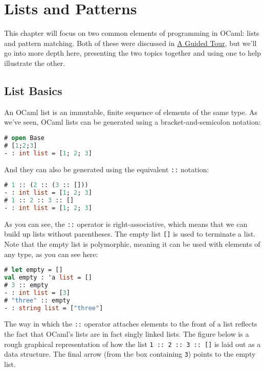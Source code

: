 \hypertarget{lists-and-patterns}{%
\section{Lists and Patterns}\label{lists-and-patterns}}

This chapter will focus on two common elements of programming in OCaml:
lists and pattern matching. Both of these were discussed in
\href{guided-tour.html\#a-guided-tour}{A Guided Tour}, but we'll go into
more depth here, presenting the two topics together and using one to
help illustrate the other.

\hypertarget{list-basics}{%
\subsection{List Basics}\label{list-basics}}

An OCaml list is an immutable, finite sequence of elements of the same
type. As we've seen, OCaml lists can be generated using a
bracket-and-semicolon notation:

\begin{lstlisting}[language=Caml]
# open Base
# [1;2;3]
- : int list = [1; 2; 3]
\end{lstlisting}

And they can also be generated using the equivalent
\passthrough{\lstinline!::!}
notation:

\begin{lstlisting}[language=Caml]
# 1 :: (2 :: (3 :: []))
- : int list = [1; 2; 3]
# 1 :: 2 :: 3 :: []
- : int list = [1; 2; 3]
\end{lstlisting}

As you can see, the \passthrough{\lstinline!::!} operator is
right-associative, which means that we can build up lists without
parentheses. The empty list \passthrough{\lstinline![]!} is used to
terminate a list. Note that the empty list is polymorphic, meaning it
can be used with elements of any type, as you can see here:

\begin{lstlisting}[language=Caml]
# let empty = []
val empty : 'a list = []
# 3 :: empty
- : int list = [3]
# "three" :: empty
- : string list = ["three"]
\end{lstlisting}

The way in which the \passthrough{\lstinline!::!} operator attaches
elements to the front of a list reflects the fact that OCaml's lists are
in fact singly linked lists. The figure below is a rough graphical
representation of how the list
\passthrough{\lstinline!1 :: 2 :: 3 :: []!} is laid out as a data
structure. The final arrow (from the box containing
\passthrough{\lstinline!3!}) points to the empty
list.

